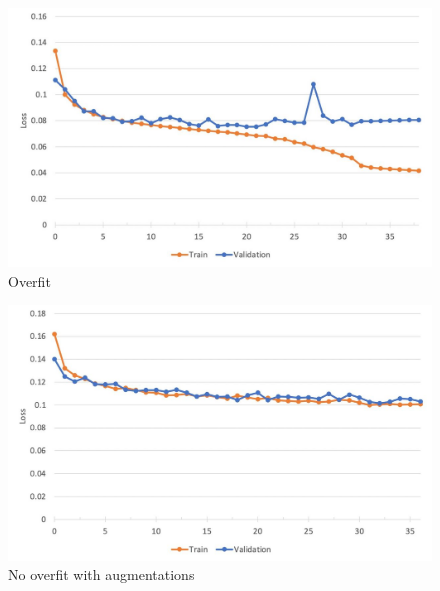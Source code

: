 
\begin{figure}[H]
	\begin{center}
		\includegraphics[width=0.5\linewidth]{bilder/actin/overfit.jpg}
		\caption{Overfit}\label{fig:actin-overfit}
	\end{center}
\end{figure}

\begin{figure}[H]
	\begin{center}
		\includegraphics[width=0.5\linewidth]{bilder/actin/no-overfit.jpg}
		\caption{No overfit with augmentations}\label{fig:actin-no-overfit}
	\end{center}
\end{figure}
